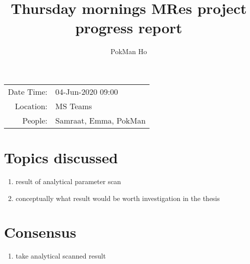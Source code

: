 \documentclass[a4paper,11pt]{article}
\title{Thursday mornings MRes project progress report}
\author{PokMan Ho}
\date{}
\begin{document}
    \maketitle
    
    \begin{tabular}{rl}
        Date Time: & 04-Jun-2020 09:00 \\
        Location: & MS Teams \\
        People: & Samraat, Emma, PokMan \\
    \end{tabular}
    
    \section{Topics discussed}
    \begin{enumerate}
        \item result of analytical parameter scan
        \item conceptually what result would be worth investigation in the thesis
    \end{enumerate}
    
    \section{Consensus}
    \begin{enumerate}
        \item take analytical scanned result 
    \end{enumerate}
\end{document}
